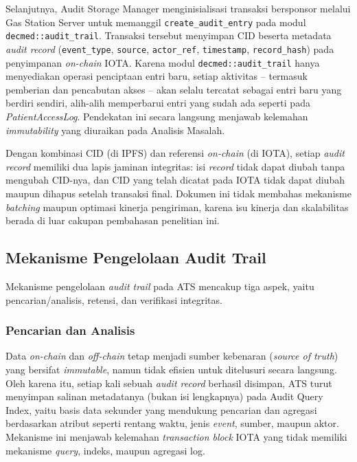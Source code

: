 Selanjutnya, Audit Storage Manager menginisialisasi transaksi bersponsor
melalui Gas Station Server untuk memanggil \texttt{create\_audit\_entry}
pada modul \texttt{decmed::audit\_trail}. Transaksi tersebut menyimpan CID
beserta metadata \textit{audit record} (\texttt{event\_type}, \texttt{source},
\texttt{actor\_ref}, \texttt{timestamp}, \texttt{record\_hash}) pada
penyimpanan \textit{on-chain} IOTA. Karena modul \texttt{decmed::audit\_trail}
hanya menyediakan operasi penciptaan entri baru, setiap aktivitas -- termasuk
pemberian dan pencabutan akses -- akan selalu tercatat sebagai entri baru
yang berdiri sendiri, alih-alih memperbarui entri yang sudah ada seperti pada
\textit{PatientAccessLog}. Pendekatan ini secara langsung menjawab kelemahan
\textit{immutability} yang diuraikan pada Analisis Masalah.

Dengan kombinasi CID (di IPFS) dan referensi \textit{on-chain} (di IOTA),
setiap \textit{audit record} memiliki dua lapis jaminan integritas: isi
\textit{record} tidak dapat diubah tanpa mengubah CID-nya, dan CID yang
telah dicatat pada IOTA tidak dapat diubah maupun dihapus setelah transaksi
final. Dokumen ini tidak membahas mekanisme \textit{batching} maupun
optimasi kinerja pengiriman, karena isu kinerja dan skalabilitas berada di
luar cakupan pembahasan penelitian ini.

\subsection{Mekanisme Pengelolaan Audit Trail}

Mekanisme pengelolaan \textit{audit trail} pada ATS mencakup tiga aspek,
yaitu pencarian/analisis, retensi, dan verifikasi integritas.

\subsubsection{Pencarian dan Analisis}
Data \textit{on-chain} dan \textit{off-chain} tetap menjadi sumber
kebenaran (\textit{source of truth}) yang bersifat \textit{immutable}, namun
tidak efisien untuk ditelusuri secara langsung. Oleh karena itu, setiap kali
sebuah \textit{audit record} berhasil disimpan, ATS turut menyimpan salinan
metadatanya (bukan isi lengkapnya) pada Audit Query Index, yaitu basis data
sekunder yang mendukung pencarian dan agregasi berdasarkan atribut seperti
rentang waktu, jenis \textit{event}, sumber, maupun aktor. Mekanisme ini
menjawab kelemahan \textit{transaction block} IOTA yang tidak memiliki
mekanisme \textit{query}, indeks, maupun agregasi log.

